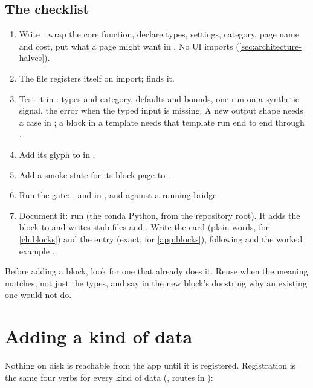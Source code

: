 \subsection{The checklist}
\begin{enumerate}
\item Write : wrap the core function, declare types, settings,
  category, page name and cost, put what a page might want in . No UI imports
  (\cref{sec:architecture-halves}).
\item The file registers itself on import;  finds it.
\item Test it in : types and category, defaults and bounds, one
  run on a synthetic signal, the error when the typed input is missing. A new output shape needs a
  case in ; a block in a template needs that template run end to
  end through .
\item Add its glyph to  in .
\item Add a smoke state for its block page to .
\item Run the gate: ,  and  in
  , and  against a running bridge.
\item Document it: run  (the conda Python, from the repository
  root). It adds the block to  and writes stub files
   and . Write the card (plain
  words, for \cref{ch:blocks}) and the entry (exact, for \cref{app:blocks}), following
   and the worked example .
\end{enumerate}
Before adding a block, look for one that already does it. Reuse when the meaning matches, not just
the types, and say in the new block's docstring why an existing one would not do.

\section{Adding a kind of data}\label{sec:extending-data}
Nothing on disk is reachable from the app until it is registered. Registration is the same four
verbs for every kind of data (, routes in
):


